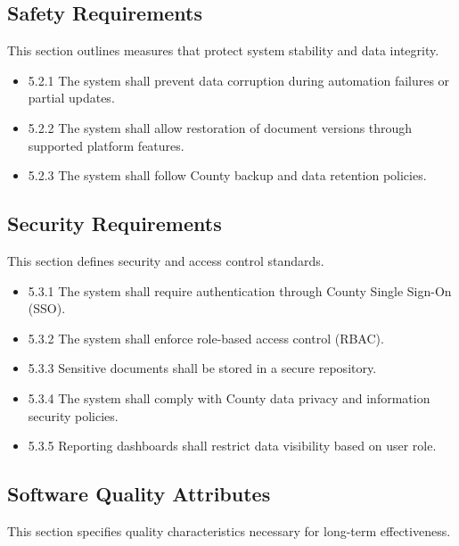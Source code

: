 \documentclass[12pt]{article}
\begin{document}

\subsection{Safety Requirements}

This section outlines measures that protect system stability and data integrity.

\begin{itemize}
    \item 5.2.1 The system shall prevent data corruption during automation failures or partial updates.
    \item 5.2.2 The system shall allow restoration of document versions through supported platform features.
    \item 5.2.3 The system shall follow County backup and data retention policies.
\end{itemize}


\subsection{Security Requirements}

This section defines security and access control standards.

\begin{itemize}
    \item 5.3.1 The system shall require authentication through County Single Sign-On (SSO).
    \item 5.3.2 The system shall enforce role-based access control (RBAC).
    \item 5.3.3 Sensitive documents shall be stored in a secure repository.
    \item 5.3.4 The system shall comply with County data privacy and information security policies.
    \item 5.3.5 Reporting dashboards shall restrict data visibility based on user role.
\end{itemize}


\subsection{Software Quality Attributes}

This section specifies quality characteristics necessary for long-term effectiveness.
\end{document}
